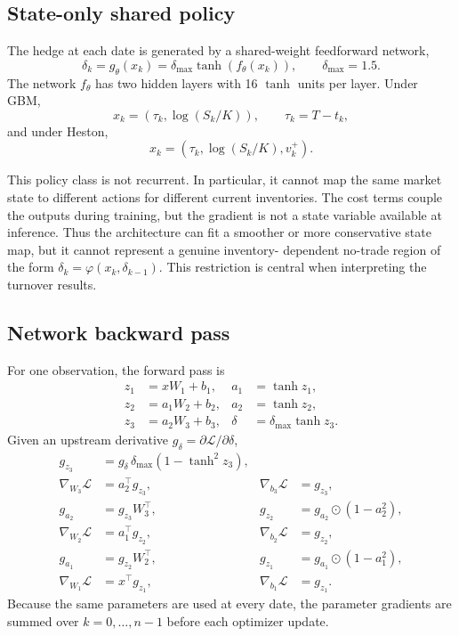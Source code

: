 \subsection{State-only shared policy}

The hedge at each date is generated by a shared-weight feedforward network,
\begin{equation}
  \delta_k=g_{\theta}(x_k)
  =\delta_{\max}\tanh\!\left(f_{\theta}(x_k)\right),
  \qquad \delta_{\max}=1.5.
  \label{eq:policy}
\end{equation}
The network $f_{\theta}$ has two hidden layers with 16 $\tanh$ units per
layer. Under GBM,
\[
  x_k=(\tau_k,\log(S_k/K)),\qquad \tau_k=T-t_k,
\]
and under Heston,
\[
  x_k=(\tau_k,\log(S_k/K),v_k^+).
\]

This policy class is not recurrent. In particular, it cannot map the same
market state to different actions for different current inventories. The cost
terms couple the outputs during training, but the gradient is not a state
variable available at inference. Thus the architecture can fit a smoother or
more conservative state map, but it cannot represent a genuine inventory-
dependent no-trade region of the form
$\delta_k=\varphi(x_k,\delta_{k-1})$. This restriction is central when
interpreting the turnover results.

\subsection{Network backward pass}

For one observation, the forward pass is
\begin{align*}
  z_1&=xW_1+b_1, & a_1&=\tanh z_1,\\
  z_2&=a_1W_2+b_2, & a_2&=\tanh z_2,\\
  z_3&=a_2W_3+b_3, & \delta&=\delta_{\max}\tanh z_3.
\end{align*}
Given an upstream derivative $g_{\delta}=\partial\mathcal L/\partial\delta$,
\begin{align*}
  g_{z_3}&=g_{\delta}\,\delta_{\max}(1-\tanh^2z_3),\\
  \nabla_{W_3}\mathcal L&=a_2^{\top}g_{z_3},
  &\nabla_{b_3}\mathcal L&=g_{z_3},\\
  g_{a_2}&=g_{z_3}W_3^{\top},
  &g_{z_2}&=g_{a_2}\odot(1-a_2^2),\\
  \nabla_{W_2}\mathcal L&=a_1^{\top}g_{z_2},
  &\nabla_{b_2}\mathcal L&=g_{z_2},\\
  g_{a_1}&=g_{z_2}W_2^{\top},
  &g_{z_1}&=g_{a_1}\odot(1-a_1^2),\\
  \nabla_{W_1}\mathcal L&=x^{\top}g_{z_1},
  &\nabla_{b_1}\mathcal L&=g_{z_1}.
\end{align*}
Because the same parameters are used at every date, the parameter gradients are
summed over $k=0,\ldots,n-1$ before each optimizer update.

